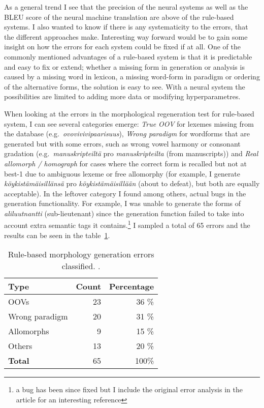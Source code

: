 \documentclass{flammie}
\begin{document}
As a general trend I see that the precision of the neural systems as well as the
BLEU score of the neural machine translation are above of the rule-based
systems. I also wanted to know if there is any systematicity to the errors, that
the different approaches make. Interesting way forward would be to gain some
insight on how the errors for each system could be fixed if at all.  One of the
commonly mentioned advantages of a rule-based system is that it is predictable
and easy to fix or extend; whether a missing form in generation or analysis is
caused by a missing word in lexicon, a missing word-form in paradigm or ordering
of the alternative forms, the solution is easy to see.  With a neural system the
possibilities are limited to adding more data or modifying hyperparametres.

When looking at the errors in the morphological regeneration test for rule-based
system, I can see several categories emerge: \textit{True OOV} for lexemes
missing from the database (e.g.\ \textit{ovovivivipaarisuus}), \textit{Wrong
paradigm} for wordforms that are generated but with some errors, such as wrong
vowel harmony or consonant gradation (e.g.\ \textit{manuskripteiltä} pro
\textit{manuskripteilta} (from manuscripts)) and \textit{Real allomorph /
homograph} for cases where the correct form is recalled but not at best-1 due to
ambiguous lexeme or free allomorphy (for example, I generate
\textit{köykistämäisillänsä} pro \textit{köykistämäisillään} (about to defeat),
but both are equally acceptable).  In the leftover category I found among
others, actual bugs in the generation functionality. For example, I was unable
to generate the forms of \textit{aliluutnantti} (sub-lieutenant) since the
generation function failed to take into account extra semantic tags it
contains.\footnote{a bug has been since fixed but I include the original error
analysis in the article for an interesting reference} I sampled a total of 65
errors and the results can be seen in the table~\ref{table:morph-gen-errors}.

\begin{table}
\begin{centering}
    \begin{tabular}{lrr}
        \toprule
        Type & \bf Count & \bf Percentage \\
        \midrule
        OOVs & 23 & 36 \% \\
        Wrong paradigm & 20 & 31 \% \\
        Allomorphs & 9 & 15 \% \\
        Others & 13 & 20 \% \\
        \midrule
        \bf Total & 65 & 100\% \\
        \bottomrule
    \end{tabular}
    \caption{Rule-based morphology generation errors classified.
\label{table:morph-gen-errors}.}
\end{centering}
\end{table}
\end{document}

